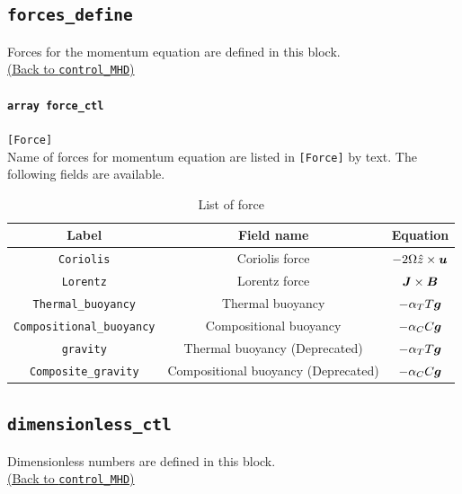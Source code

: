 \subsection{\tt forces\_define}
\label{href_t:forces_define}
Forces for the momentum equation are defined in this block. \\
\hyperref[href_i:forces_define]{(Back to {\tt control\_MHD})}

\paragraph{\tt array force\_ctl}
\label{href_t:force_ctl}
\verb|[Force]| \\
Name of forces for momentum equation are listed in \verb|[Force]| by text.
The following fields are available.
%
\begin{table}[htp]
\caption{List of force}
\begin{center}
\begin{tabular}{|c|c|c|}
\hline
 Label & Field name & Equation \\ \hline
\verb|Coriolis| & Coriolis force & $-2\Omega \hat{z} \times \mbox{\boldmath$u$} $ \\
\verb|Lorentz| & Lorentz force &  $\mbox{\boldmath$J$} \times \mbox{\boldmath$B$} $ \\
\verb|Thermal_buoyancy| & Thermal buoyancy & $-\alpha_{T} T \mbox{\boldmath$g$}$ \\
\verb|Compositional_buoyancy| & Compositional buoyancy  & $-\alpha_{C} C \mbox{\boldmath$g$}$\\ \hline
\verb|gravity| & Thermal buoyancy {\color{red} (Deprecated)} & $-\alpha_{T} T \mbox{\boldmath$g$}$ \\
\verb|Composite_gravity| & Compositional buoyancy {\color{red} (Deprecated)} & $-\alpha_{C} C \mbox{\boldmath$g$}$\\ \hline
\end{tabular}
\end{center}
\label{table:forces}
\end{table}
%

\subsection{\tt dimensionless\_ctl}
\label{href_t:dimensionless_ctl}
Dimensionless numbers are defined in this block. \\
\hyperref[href_i:dimensionless_ctl]{(Back to {\tt control\_MHD})}

